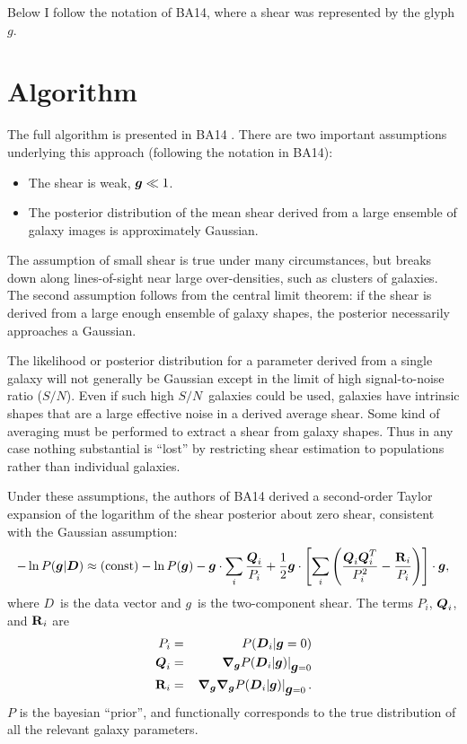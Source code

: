 \documentclass[12pt,preprint]{aastex}
\newcommand{\sn}{$S/N$}
\newcommand{\vecg}{\mbox{\boldmath $g$}}
\newcommand{\vecD}{\mbox{\boldmath $D$}}
\newcommand{\vecQ}{\mbox{\boldmath $Q$}}
\newcommand{\matR}{\mbox{$\bf R$}}
\newcommand{\bnabg}{ \boldsymbol{\nabla_g}}
\begin{document}
Below I follow the notation of BA14, where a shear was represented by the
glyph \vecg.

\section{Algorithm} \label{sec:algo}

The full algorithm is presented in BA14 .  There are two important assumptions
underlying this approach (following the notation in BA14):

\begin{itemize}

    \item The shear is weak, $\vecg \ll 1$.

    \item The posterior distribution of the mean shear derived from a large
        ensemble of galaxy images is approximately Gaussian.

\end{itemize}

The assumption of small shear is true under many circumstances, but breaks down
along lines-of-sight near large over-densities, such as clusters of galaxies.
The second assumption follows from the central limit theorem: if the shear is
derived from a large enough ensemble of galaxy shapes, the posterior
necessarily approaches a Gaussian.

The likelihood or posterior distribution for a parameter derived from a single
galaxy will not generally be Gaussian except in the limit of high
signal-to-noise ratio (\sn). Even if such high \sn\ galaxies could be used,
galaxies have intrinsic shapes that are a large effective noise in a derived
average shear.  Some kind of averaging must be performed to extract a shear
from galaxy shapes.  Thus in any case nothing substantial is ``lost'' by
restricting shear estimation to populations rather than individual galaxies.  

Under these assumptions, the authors of BA14 derived a second-order Taylor
expansion of the logarithm of the shear posterior about zero shear, consistent
with the Gaussian assumption:
\begin{equation} \label{eq:pexpand}
-\ln P(\vecg | \vecD) \approx {(\rm const)} - \ln P(\vecg) - \vecg \cdot \sum_i
    \frac{\vecQ_i}{P_i}
    + \frac{1}{2} \vecg \cdot \left[ \sum_i \left(\frac{\vecQ_i \vecQ^T_i}{P_i^2}
    - \frac{\matR_i}{P_i}\right) \right] \cdot \vecg,
\end{equation}
where \vecD\ is the data vector and \vecg\ is the two-component shear.  The
terms $P_i$, $\vecQ_i$, and $\matR_i$ are 
\begin{eqnarray} \label{eq:pqrdef}
P_i     & = & P(\vecD_i | \vecg=0) \nonumber \\
\vecQ_i & = & \left. \bnabg P(\vecD_i | \vecg)\right|_{\vecg=0} \\
\matR_i & = & \left. \bnabg \bnabg P(\vecD_i | \vecg)\right|_{\vecg=0}. \nonumber
\end{eqnarray}
$P$ is the bayesian ``prior'', and functionally corresponds to the true
distribution of all the relevant galaxy parameters.
\end{document}
